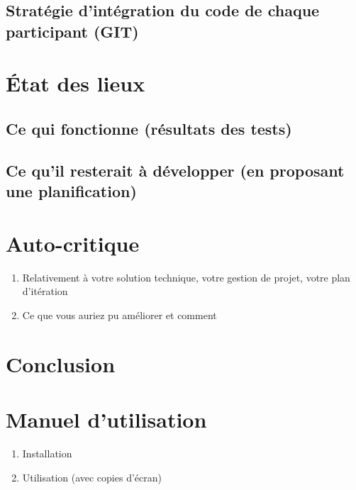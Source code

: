 \documentclass[a4paper,11pt]{article}
\begin{document}
	\subsection{Stratégie d'intégration du code de chaque participant (GIT)}


	\section{État des lieux}
	
	\subsection{Ce qui fonctionne (résultats des tests)}
	
	\subsection{Ce qu'il resterait à développer (en proposant une planification)}
	
	
	\section{Auto-critique}
	\begin{enumerate}
		\item Relativement à votre solution technique, votre gestion de projet, votre plan d'itération
		\item Ce que vous auriez pu améliorer et comment
	\end{enumerate}


	\section{Conclusion}
	
	
	\appendix
	\section{Manuel d'utilisation} \label{app:manuelUtil}
	\begin{enumerate}
		\item Installation
		\item Utilisation (avec copies d'écran)
	\end{enumerate}
\end{document}
